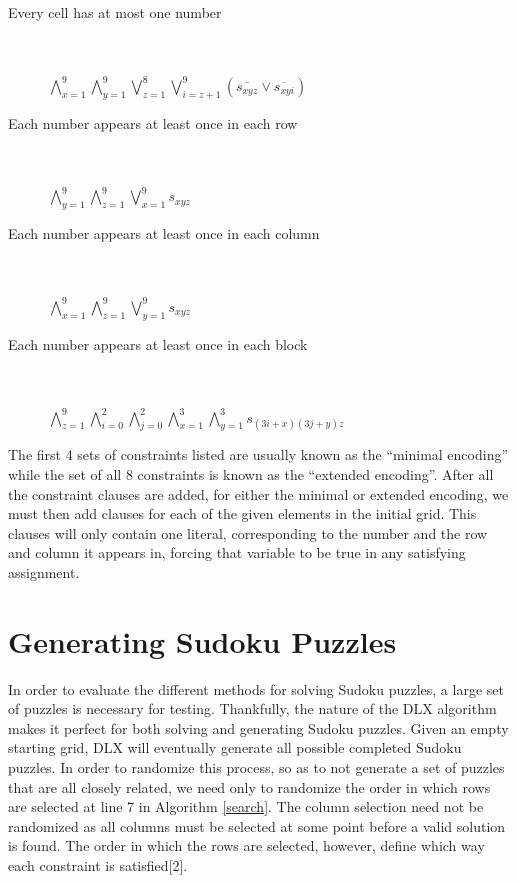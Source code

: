 \documentclass[12pt]{article}
\newcounter{row}
\newcounter{col}
\begin{document}
\begin{description}
\item[Every cell has at most one number] \hfill \\ \\
$\bigwedge\limits_{x=1}^{9} \bigwedge\limits_{y=1}^{9} \bigvee\limits_{z=1}^{8} \bigvee\limits_{i=z+1}^{9} (\overline{s_{xyz}} \vee \overline{s_{xyi}})$
\item[Each number appears at least once in each row] \hfill \\ \\
$\bigwedge\limits_{y=1}^{9} \bigwedge\limits_{z=1}^{9} \bigvee\limits_{x=1}^{9}   s_{xyz}$
\item[Each number appears at least once in each column] \hfill \\ \\
$\bigwedge\limits_{x=1}^{9} \bigwedge\limits_{z=1}^{9} \bigvee\limits_{y=1}^{9} s_{xyz}$
\item[Each number appears at least once in each block] \hfill \\ \\
$\bigwedge\limits_{z=1}^{9} \bigwedge\limits_{i=0}^{2} \bigwedge\limits_{j=0}^{2} \bigwedge\limits_{x=1}^{3} \bigwedge\limits_{y=1}^{3} s_{(3i+x)(3j+y)z}$
\end{description}
The first 4 sets of constraints listed are usually known as the ``minimal encoding'' while the set of all 8 constraints is known as the ``extended encoding''. After all the constraint clauses are added, for either the minimal or extended encoding, we must then add clauses for each of the given elements in the initial grid. This clauses will only contain one literal, corresponding to the number and the row and column it appears in, forcing that variable to be true in any satisfying assignment.

\section{Generating Sudoku Puzzles}
In order to evaluate the different methods for solving Sudoku puzzles, a large set of puzzles is necessary for testing. Thankfully, the nature of the DLX algorithm makes it perfect for both solving and generating Sudoku puzzles. Given an empty starting grid, DLX will eventually generate all possible completed Sudoku puzzles. In order to randomize this process, so as to not generate a set of puzzles that are all closely related, we need only to randomize the order in which rows are selected at line 7 in Algorithm \ref{search}. The column selection need not be randomized as all columns must be selected at some point before a valid solution is found. The order in which the rows are selected, however, define which way each constraint is satisfied[2]. \\
\end{document}
